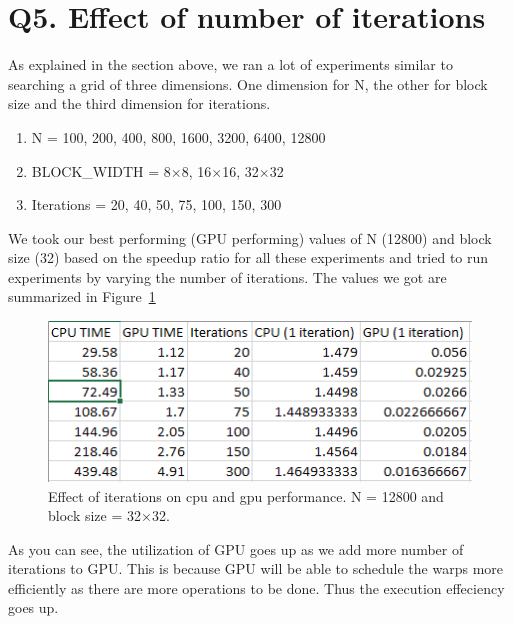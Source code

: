 \documentclass{article}
\begin{document}
\section{Q5. Effect of number of iterations}
As explained in the section above, we ran a lot of experiments similar to searching a grid of three dimensions.  One dimension for N, the other for block size and the third dimension for iterations.
\begin{enumerate}
\item N = 100, 200, 400, 800, 1600, 3200, 6400, 12800
\item BLOCK\_WIDTH = 8$\times$8, 16$\times$16, 32$\times$32
\item Iterations = 20, 40, 50, 75, 100, 150, 300
\end{enumerate}

We took our best performing (GPU performing) values of N (12800) and block size (32) based on the speedup ratio for all these experiments and tried to run experiments by varying the number of iterations.  The values we got are summarized in Figure~\ref{fig:iterations}

\begin{figure}[ht!]
  \centering
  \includegraphics[width=1\textwidth]{iterations}
  \caption{Effect of iterations on cpu and gpu performance.  N = 12800 and block size = 32$\times$32.\label{fig:iterations}}
\end{figure}

As you can see, the utilization of GPU goes up as we add more number of iterations to GPU\@.  This is because GPU will be able to schedule the warps more efficiently as there are more operations to be done.  Thus the execution effeciency goes up.
\end{document}
